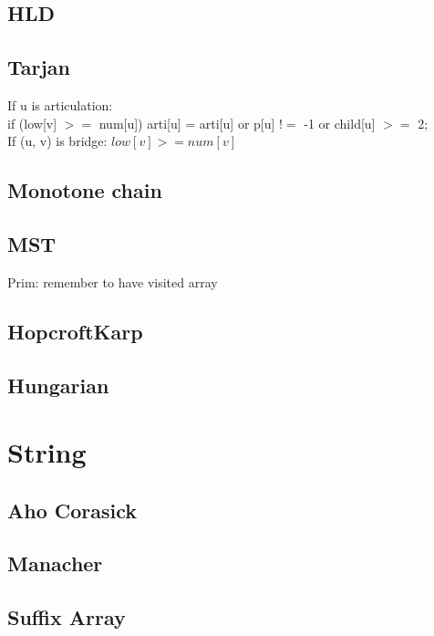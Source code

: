 \documentclass[A4 paper, 12pt, oneside]{article}
\begin{document}
\begin{landscape}
\begin{multicols}{2}
	\subsection{HLD}
	
	
	\subsection{Tarjan}
If u is articulation: \\
if (low[v] $>=$ num[u]) arti[u] = arti[u] or p[u] $!=$ -1 or child[u] $>=$ 2; \\
If (u, v) is bridge: $low[v] >= num[v]$
	\subsection{Monotone chain}
	

	\subsection{MST}
	Prim: remember to have visited array
	
	\subsection{HopcroftKarp}
	
	
	\subsection{Hungarian}
	
	
\section{String}
	\subsection{Aho Corasick}
	
	
	\subsection{Manacher}
	
	
	\subsection{Suffix Array}
	
	

\end{multicols}
\end{landscape}
\end{document}
